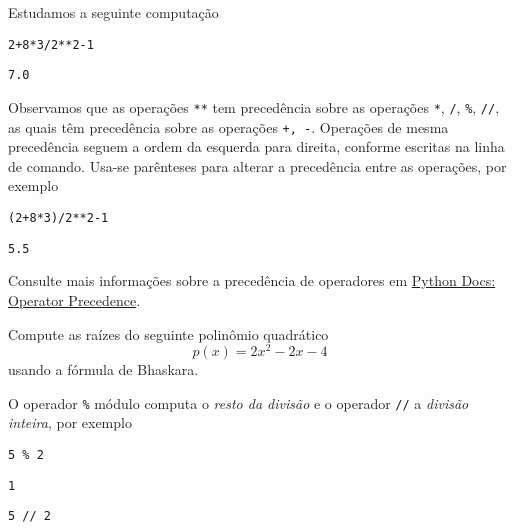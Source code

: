 \documentclass[a4paper,10pt,twoside]{article}
\begin{document}
\begin{ex}
  Estudamos a seguinte computação

\begin{lstlisting}
2+8*3/2**2-1
\end{lstlisting}

\begin{verbatim}
7.0
\end{verbatim}

Observamos que as operações \texttt{**} tem precedência sobre as operações \texttt{*}, \texttt{/}, \texttt{\%}, \texttt{//}, as quais têm precedência sobre as operações \texttt{+, -}. Operações de mesma precedência seguem a ordem da esquerda para direita, conforme escritas na linha de comando. Usa-se parênteses para alterar a precedência entre as operações, por exemplo

\begin{lstlisting}
(2+8*3)/2**2-1
\end{lstlisting}

\begin{verbatim}
5.5
\end{verbatim}

\end{ex}

\begin{obs}
Consulte mais informações sobre a precedência de operadores em \href{https://docs.python.org/3/reference/expressions.html#operator-precedence}{Python Docs: Operator Precedence}.
\end{obs}

\begin{exr}\label{exr:bhaskara}
  Compute as raízes do seguinte polinômio quadrático
  \begin{equation}
    p(x) = 2x^2 - 2x - 4
  \end{equation}
  usando a fórmula de Bhaskara{\bhaskara}.
\end{exr}

O operador \texttt{\%} módulo computa o \emph{resto da divisão} e o operador \texttt{//} a \emph{divisão inteira}, por exemplo

\begin{lstlisting}
5 % 2
\end{lstlisting}

\begin{verbatim}
1
\end{verbatim}

\begin{lstlisting}
5 // 2
\end{lstlisting}
\end{document}
